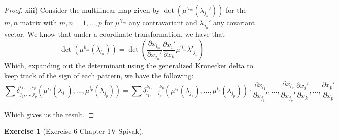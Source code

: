 \documentclass{article}
\newtheorem{exercise}{Exercise}
\begin{document}
\begin{proof}
  xiii) Consider the multilinear map given by $\det(\mu^{\prime i_{m}}(\lambda_{j_{n}}'))$ for the $m,n$ matrix with $m,n = 1,...,p$ for $\mu^{\prime i_{m}}$ any contravariant and $\lambda_{j_{n}}'$ any covariant vector. We know that under a coordinate transformation, we have that \[\det(\mu^{k_{m}}(\lambda_{l_{n}})) = \det\left(\frac{\partial x_{l_{m}}}{\partial x_{j_{n}}'} \frac{\partial x_{i}'}{\partial x_{k}} \mu^{\prime i_{m}}\lambda'_{j_{n}} \right) \]
  Which, expanding out the determinant using the generalized Kronecker delta to keep track of the sign of each pattern, we have the following:
  \[
    \sum \delta_{j_{1},...,j_{p}}^{i_{1},...,i_{p}}(\mu^{i_{1}}(\lambda_{j_{1}}),..., \mu^{i_{p}}(\lambda_{j_{p}})) = \sum \delta_{l_{1},...,l_{p}}^{k_{1},...,k_{p}}(\mu^{i_{1}}(\lambda_{j_{1}}),..., \mu^{i_{p}}(\lambda_{j_{p}}) )\cdot \frac{\partial x_{l_{1}}}{\partial x_{j_{1}}'},...,\frac{\partial x_{l_{p}}}{\partial x_{j_{p}}'}\frac{\partial x_{i}'}{\partial x_{k}},...,\frac{\partial x_{p}'}{\partial x_{p}} 
  \]

  Which gives us the result.
\end{proof}


\begin{exercise}[Exercise 6 Chapter 1V Spivak]  
\end{exercise}
\end{document}
